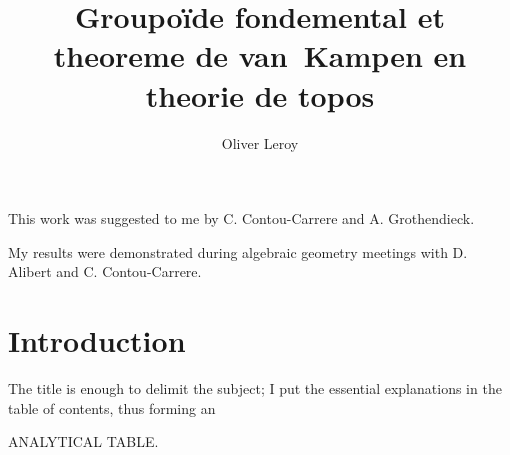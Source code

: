 \documentclass[10pt]{amsart}
\begin{document}
\title{Groupo\"ide fondemental et theoreme de van~Kampen en theorie de topos}
\author{Oliver Leroy}
\maketitle

\begin{center}
This work was suggested to me by C. Contou-Carrere and A. Grothendieck.

My results were demonstrated during algebraic geometry meetings with D. Alibert and C. Contou-Carrere.
\end{center}

\section*{Introduction}

The title is enough to delimit the subject; I put the essential explanations in the table of contents, thus
forming an
\begin{center}
ANALYTICAL TABLE.
\end{center}
\end{document}
